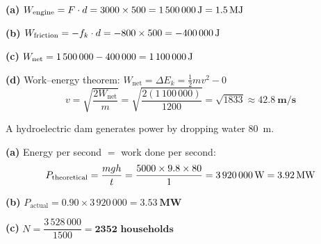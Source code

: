 \documentclass[addpoints]{exam}
\begin{document}
\begin{questions}
\begin{solution}[9cm]
\textbf{(a)} $W_\text{engine} = F \cdot d = 3000 \times 500 = \mathbf{\SI{1\,500\,000}{J} = \SI{1.5}{MJ}}$

\textbf{(b)} $W_\text{friction} = -f_k \cdot d = -800 \times 500 = \mathbf{-\SI{400\,000}{J}}$

\textbf{(c)} $W_\text{net} = 1\,500\,000 - 400\,000 = \mathbf{\SI{1\,100\,000}{J}}$

\textbf{(d)} Work--energy theorem: $W_\text{net} = \Delta E_k = \tfrac{1}{2}mv^2 - 0$
\[
v = \sqrt{\frac{2 W_\text{net}}{m}} = \sqrt{\frac{2(1\,100\,000)}{1200}}
= \sqrt{1833} \approx \mathbf{\SI{42.8}{m/s}}
\]
\end{solution}

\question A hydroelectric dam generates power by dropping water \SI{80}{m}.
\begin{solution}[8cm]
\textbf{(a)} Energy per second $= $ work done per second:
\[
P_\text{theoretical} = \frac{mgh}{t} = \frac{5000 \times 9.8 \times 80}{1}
= \mathbf{\SI{3\,920\,000}{W} = \SI{3.92}{MW}}
\]

\textbf{(b)} $P_\text{actual} = 0.90 \times 3\,920\,000 = \mathbf{\SI{3.53}{MW}}$

\textbf{(c)} $N = \dfrac{3\,528\,000}{1500} = \mathbf{2352 \text{ households}}$
\end{solution}

\end{questions}
\end{document}
